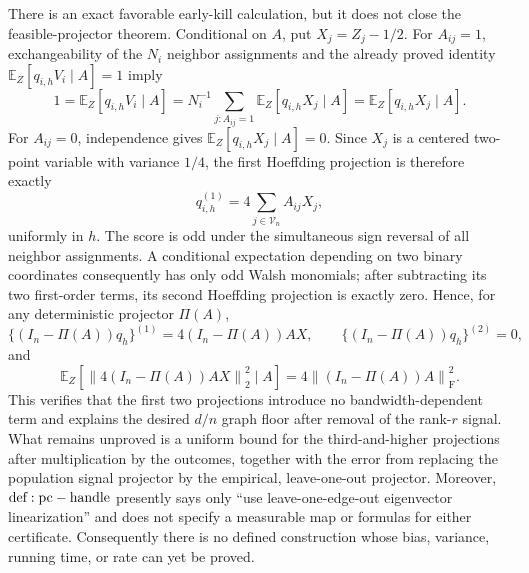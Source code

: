 There is an exact favorable early-kill calculation, but it does not close the feasible-projector theorem.  Conditional on \(A\), put \(X_j=Z_j-1/2\).  For \(A_{ij}=1\), exchangeability of the \(N_i\) neighbor assignments and the already proved identity \(\mathbb E_Z[q_{i,h}V_i\mid A]=1\) imply
\[
 1=\mathbb E_Z[q_{i,h}V_i\mid A]
 =N_i^{-1}\sum_{j:A_{ij}=1}\mathbb E_Z[q_{i,h}X_j\mid A]
 =\mathbb E_Z[q_{i,h}X_j\mid A].
\]
For \(A_{ij}=0\), independence gives \(\mathbb E_Z[q_{i,h}X_j\mid A]=0\).  Since \(X_j\) is a centered two-point variable with variance \(1/4\), the first Hoeffding projection is therefore exactly
\[
 q_{i,h}^{(1)}=4\sum_{j\in\mathcal V_n}A_{ij}X_j,
\]
uniformly in \(h\).  The score is odd under the simultaneous sign reversal of all neighbor assignments.  A conditional expectation depending on two binary coordinates consequently has only odd Walsh monomials; after subtracting its two first-order terms, its second Hoeffding projection is exactly zero.  Hence, for any deterministic projector \(\Pi(A)\),
\[
 \bigl\{(I_n-\Pi(A))q_h\bigr\}^{(1)}
 =4(I_n-\Pi(A))AX,
 \qquad
 \bigl\{(I_n-\Pi(A))q_h\bigr\}^{(2)}=0,
\]
and
\[
 \mathbb E_Z\left[\left\|4(I_n-\Pi(A))AX\right\|_2^2\mid A\right]
 =4\left\|(I_n-\Pi(A))A\right\|_{\mathrm F}^2.
\]
This verifies that the first two projections introduce no bandwidth-dependent term and explains the desired \(d/n\) graph floor after removal of the rank-\(r\) signal.  What remains unproved is a uniform bound for the third-and-higher projections after multiplication by the outcomes, together with the error from replacing the population signal projector by the empirical, leave-one-out projector.  Moreover, \({\rm def:pc-handle}\) presently says only ``use leave-one-edge-out eigenvector linearization'' and does not specify a measurable map or formulas for either certificate.  Consequently there is no defined construction whose bias, variance, running time, or rate can yet be proved.